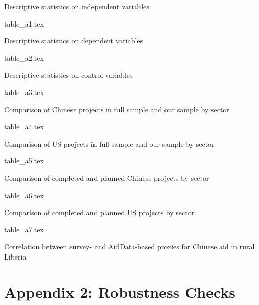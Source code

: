 \documentclass[9pt]{article}
\begin{document}
\setlength{\tabcolsep}{5pt}
\begin{table}[H]
\caption{Descriptive statistics on independent variables}
\label{reg}
\centering
{table_a1.tex}
\end{table}

\setlength{\tabcolsep}{5pt}
\begin{table}[H]
\caption{Descriptive statistics on dependent variables}
\label{reg}
\centering
{table_a2.tex}
\end{table}

\setlength{\tabcolsep}{5pt}
\begin{table}[H]
\caption{Descriptive statistics on control variables}
\label{reg}
\centering
{table_a3.tex}
\end{table}

\setlength{\tabcolsep}{5pt}
\begin{table}[H]
\caption{Comparison of Chinese projects in full sample and our sample by sector}
\label{reg}
\centering
{table_a4.tex}
\end{table}

\setlength{\tabcolsep}{5pt}
\begin{table}[H]
\caption{Comparison of US projects in full sample and our sample by sector}
\label{reg}
\centering
{table_a5.tex}
\end{table}

\setlength{\tabcolsep}{5pt}
\begin{table}[H]
\caption{Comparison of completed and planned Chinese projects by sector}
\label{reg}
\centering
{table_a6.tex}
\end{table}

\setlength{\tabcolsep}{5pt}
\begin{table}[H]
\caption{Comparison of completed and planned US projects by sector}
\label{reg}
\centering
{table_a7.tex}
\end{table}

\setlength{\tabcolsep}{5pt}
\begin{table}[H]
\caption{Correlation between survey- and AidData-based proxies for Chinese aid in rural Liberia}
\label{reg}
\centering
\end{table}

\newpage
\section{Appendix 2: Robustness Checks}
\end{document}
